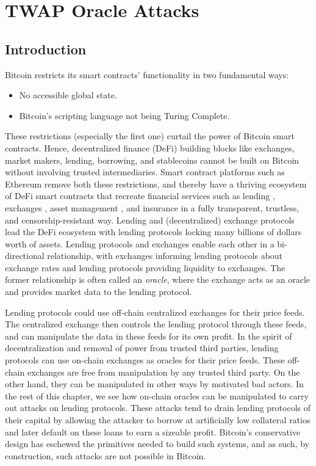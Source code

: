 \chapter{TWAP Oracle Attacks}  %
\label{chapter:oracles}

\section{Introduction}
Bitcoin restricts its smart contracts' functionality in two fundamental ways:
\begin{itemize}
\item No accessible global state.
\item Bitcoin's scripting language not being Turing Complete.
\end{itemize}
These restrictions (especially the first one) curtail the power of Bitcoin smart contracts. Hence, decentralized finance (DeFi) building blocks like exchanges, market makers, lending, borrowing, and stablecoins cannot be built on Bitcoin without involving trusted intermediaries. Smart contract platforms such as Ethereum \cite{wood2014ethereum} remove both these restrictions, and thereby have a thriving ecosystem of DeFi smart contracts that recreate financial services such as lending \cite{leshner2019compound,AaveWhitepaper}, exchanges \cite{Zhang2018UniV1,warren20170x}, asset management \cite{yearn_finance,convex_finance}, and insurance \cite{KarpNexusMutual} in a fully transparent, trustless, and censorship-resistant way. Lending and (decentralized) exchange protocols lead the DeFi ecosystem with lending protocols locking many billions of dollars worth of assets. Lending protocols and exchanges enable each other in a bi-directional relationship, with exchanges informing lending protocols about exchange rates and lending protocols providing liquidity to exchanges. The former relationship is often called an \textit{oracle}, where the exchange acts as an oracle and provides market data to the lending protocol. 

Lending protocols could use off-chain centralized exchanges for their price feeds. The centralized exchange then controls the lending protocol through these feeds, and can manipulate the data in these feeds for its own profit. In the spirit of decentralization and removal of power from trusted third parties, lending protocols can use on-chain exchanges as oracles for their price feeds. These off-chain exchanges are free from manipulation by any trusted third party. On the other hand, they can be manipulated in other ways by motivated bad actors. In the rest of this chapter, we see how on-chain oracles can be manipulated to carry out attacks on lending protocols. These attacks tend to drain lending protocols of their capital by allowing the attacker to borrow at artificially low collateral ratios and later default on these loans to earn a sizeable profit. Bitcoin's conservative design has eschewed the primitives needed to build such systems, and as such, by construction, such attacks are not possible in Bitcoin.

